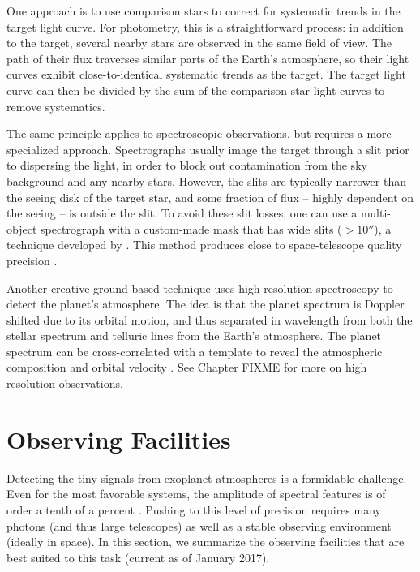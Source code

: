 \documentclass[graybox,natbib,nosecnum]{svmult}
\begin{document}
One approach is to use comparison stars to correct for systematic trends in the target light curve. For photometry, this is a straightforward process: in addition to the target, several nearby stars are observed in the same field of view. The path of their flux traverses similar parts of the Earth's atmosphere, so their light curves exhibit close-to-identical systematic trends as the target. The target light curve can then be divided by the sum of the comparison star light curves to remove systematics.  %

The same principle applies to spectroscopic observations, but requires a more specialized approach.  Spectrographs usually image the target through a slit prior to dispersing the light, in order to block out contamination from the sky background and any nearby stars. However, the slits are typically narrower than the seeing disk of the target star, and some fraction of flux -- highly dependent on the seeing -- is outside the slit.  To avoid these slit losses, one can use a multi-object spectrograph with a custom-made mask that has wide slits ($>10''$), a technique developed by \cite{bean10}. This method produces close to space-telescope quality precision \citep[e.g.][]{}.  

Another creative ground-based technique uses high resolution spectroscopy to detect the planet's atmosphere.  The idea is that the planet spectrum is Doppler shifted due to its orbital motion, and thus separated in wavelength from both the stellar spectrum and telluric lines from the Earth's atmosphere. The planet spectrum can be cross-correlated with a template to reveal the atmospheric composition and orbital velocity \citep[e.g.][]{snellen10}.  See Chapter FIXME for more on high resolution observations. 

\section{Observing Facilities}
Detecting the tiny signals from exoplanet atmospheres is a formidable challenge. Even for the most favorable systems, the amplitude of spectral features is of order a tenth of a percent \citep[e.g.][]{evans16}. Pushing to this level of precision requires many photons (and thus large telescopes) as well as a stable observing environment (ideally in space).  In this section, we summarize the observing facilities that are best suited to this task (current as of January 2017).
\end{document}
